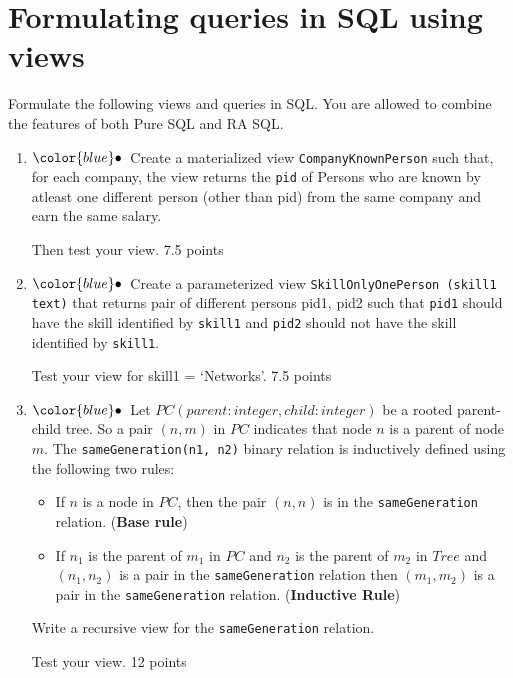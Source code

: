 \documentclass[11pt]{article}
\newcommand{\blue}[1]{{\color{blue}#1}}
\newcommand{\bluebullet}{$\blue{\bullet}$}
\begin{document}
\section{Formulating queries in SQL using views}


Formulate the following views and queries in SQL. You are allowed to combine the features of both Pure SQL and RA SQL.

\begin{enumerate}[resume]

\item  \label{viewtriangle} \bluebullet\ 
Create a materialized view {\tt CompanyKnownPerson} such that, for each company, the view returns the {\tt pid} of Persons who are known by atleast one different person (other than pid) from the same company and earn the same salary.


Then test your view. \hfill 7.5 points
           

\item \bluebullet\ 	Create a parameterized view {\tt SkillOnlyOnePerson (skill1 text)} that returns pair of different persons pid1, pid2 such that {\tt pid1} should have the skill identified by {\tt skill1} and {\tt pid2} should not have the skill identified by {\tt skill1}. 

Test your view for skill1 = ‘Networks’. \hfill 7.5 points


\item \bluebullet\  Let $PC(parent: integer, child: integer)$ be a rooted parent-child tree.   So a pair $(n,m)$ in $PC$ indicates that node $n$ is a parent of node $m$.
The {\tt sameGeneration(n1, n2)} binary relation is inductively defined using the following two rules:
\begin{itemize}
\item If $n$ is a node in $PC$, then the pair $(n,n)$ is in the {\tt sameGeneration} relation. ({\bf Base rule})
\item If $n_1$ is the parent of $m_1$ in $PC$ and $n_2$ is the parent of $m_2$ in $Tree$ and 
$(n_1,n_2)$ is a pair in the {\tt sameGeneration} relation then $(m_1,m_2)$ is a pair in the {\tt sameGeneration} relation. ({\bf Inductive Rule})
\end{itemize}

Write a \blue{recursive view} for the {\tt sameGeneration} relation.

Test your view.  \hfill 12 points
\end{enumerate}
\end{document}
